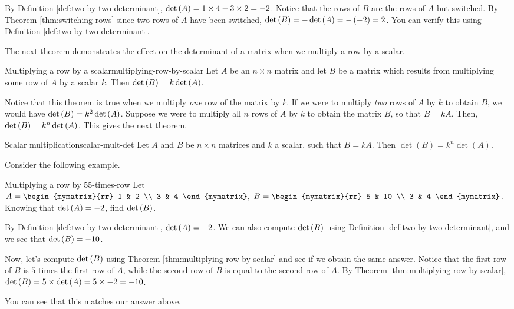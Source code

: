 \begin{solution}
By Definition \ref{def:two-by-two-determinant}, 
$\det \left(A\right) = 1 \times 4 - 3 \times 2 = -2$. 
Notice that the rows of $B$ are the rows of $A$ but switched. 
By Theorem \ref{thm:switching-rows} since two rows of $A$ have been switched,
$\det \left(B\right) = - \det \left(A\right) = - \left(-2\right) = 2$.
You can verify this using Definition \ref{def:two-by-two-determinant}. 
\end{solution}

The next theorem demonstrates the effect on the determinant of a matrix when we multiply
a row by a scalar.

\begin{theorem}{Multiplying a row by a scalar}{multiplying-row-by-scalar}
Let $A$ be an $n\times n$ matrix and let $B$ be a matrix
which results from multiplying some row of $A$ by a scalar $k$. Then $\det
\left(B\right) = k \det \left(A\right) $.
\end{theorem}

Notice that this theorem is true when we multiply {\em one\em} row of the matrix by $k$.
If we were to multiply {\em two\em} rows of $A$ by $k$ to obtain $B$, we would have
$\det \left(B\right) = k^2 \det \left(A\right)$.
Suppose we were to multiply all $n$ rows of $A$ by $k$ to obtain the matrix $B$, so that 
$B = kA$. Then, $\det \left(B\right) = k^n \det \left(A\right)$. This gives the next theorem.

\begin{theorem}{Scalar multiplication}{scalar-mult-det}
Let $A$ and $B$ be $n \times n$ matrices and $k$ a scalar, such that $B = kA$. Then $\det(B) = k^n \det(A)$.
\end{theorem}

Consider the following example.

\begin{example}{Multiplying a row by 5}{5-times-row}
Let $A=\begin{mymatrix}{rr}
1 & 2 \\
3 & 4
\end{mymatrix} ,\ B=\begin{mymatrix}{rr}
5 & 10 \\
3 & 4
\end{mymatrix}$. 
Knowing that $\det \left(A \right) =-2$, find  $\det \left(B \right) $.
\end{example}

\begin{solution} 
By Definition \ref{def:two-by-two-determinant}, $\det \left(A\right) =-2$. We can also compute
$\det \left(B\right)$ using Definition \ref{def:two-by-two-determinant}, and we see that $\det \left(B\right) = -10$. 

Now, let's compute  $\det \left(B\right)$ using Theorem \ref{thm:multiplying-row-by-scalar} and see if we
obtain the same answer. Notice that the first row of $B$ is $5$ times the first row of $A$, while the
second row of $B$ is equal to the second row of $A$. 
By Theorem \ref{thm:multiplying-row-by-scalar}, 
$\det  \left(B \right) = 5 \times \det \left(A \right) = 5 \times -2 = -10$.

You can see that this matches our answer above.
\end{solution}

